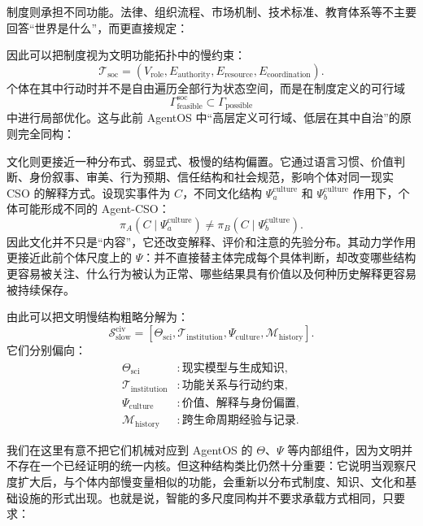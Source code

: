 制度则承担不同功能。法律、组织流程、市场机制、技术标准、教育体系等不主要回答“世界是什么”，而更直接规定：
\begin{statementbox}
\centering
{}
\end{statementbox}
因此可以把制度视为文明功能拓扑中的慢约束：
\[
\mathcal T_{\mathrm{soc}}
=
(V_{\mathrm{role}},E_{\mathrm{authority}},E_{\mathrm{resource}},E_{\mathrm{coordination}}).
\]
个体在其中行动时并不是自由遍历全部行为状态空间，而是在制度定义的可行域
\[
\Gamma_{\mathrm{feasible}}^{\mathrm{soc}}
\subset
\Gamma_{\mathrm{possible}}
\]
中进行局部优化。这与此前 AgentOS 中“高层定义可行域、低层在其中自治”的原则完全同构：
\begin{statementbox}
\centering
{}
\end{statementbox}

文化则更接近一种分布式、弱显式、极慢的结构偏置。它通过语言习惯、价值判断、身份叙事、审美、行为预期、信任结构和社会规范，影响个体对同一现实 CSO 的解释方式。设现实事件为 $C$，不同文化结构 $\Psi^{\mathrm{culture}}_a$ 和 $\Psi^{\mathrm{culture}}_b$ 作用下，个体可能形成不同的 Agent-CSO：
\[
\pi_A(C\mid\Psi^{\mathrm{culture}}_a)
\neq
\pi_B(C\mid\Psi^{\mathrm{culture}}_b).
\]
因此文化并不只是“内容”，它还改变解释、评价和注意的先验分布。其动力学作用更接近此前个体尺度上的 $\Psi$：并不直接替主体完成每个具体判断，却改变哪些结构更容易被关注、什么行为被认为正常、哪些结果具有价值以及何种历史解释更容易被持续保存。

由此可以把文明慢结构粗略分解为：
\[
\mathcal S_{\mathrm{slow}}^{\mathrm{civ}}
=
\left[
\Theta_{\mathrm{sci}},
\mathcal T_{\mathrm{institution}},
\Psi_{\mathrm{culture}},
\mathcal M_{\mathrm{history}}
\right].
\]
它们分别偏向：
\[
\begin{aligned}
\Theta_{\mathrm{sci}} &: \text{现实模型与生成知识},\\
\mathcal T_{\mathrm{institution}} &: \text{功能关系与行动约束},\\
\Psi_{\mathrm{culture}} &: \text{价值、解释与身份偏置},\\
\mathcal M_{\mathrm{history}} &: \text{跨生命周期经验与记录}.
\end{aligned}
\]

我们在这里有意不把它们机械对应到 AgentOS 的 $\Theta$、$\Psi$ 等内部组件，因为文明并不存在一个已经证明的统一内核。但这种结构类比仍然十分重要：它说明当观察尺度扩大后，与个体内部慢变量相似的功能，会重新以分布式制度、知识、文化和基础设施的形式出现。也就是说，智能的多尺度同构并不要求承载方式相同，只要求：
\begin{statementbox}
\centering
{}
\end{statementbox}

